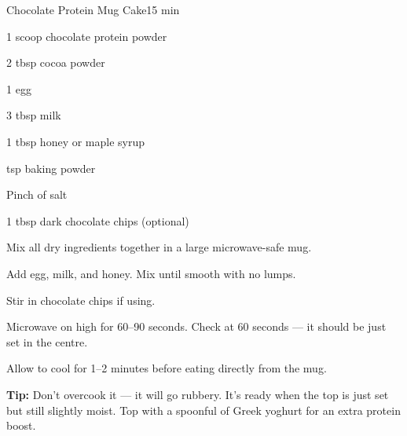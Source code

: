 \begin{recipebox}{Chocolate Protein Mug Cake}{1}{5 min}
\begin{ingredients}
  \item 1 scoop chocolate protein powder
  \item 2 tbsp cocoa powder
  \item 1 egg
  \item 3 tbsp milk
  \item 1 tbsp honey or maple syrup
  \item \textonehalf{} tsp baking powder
  \item Pinch of salt
  \item 1 tbsp dark chocolate chips (optional)
\end{ingredients}

\begin{method}
  \item Mix all dry ingredients together in a large microwave-safe mug.
  \item Add egg, milk, and honey. Mix until smooth with no lumps.
  \item Stir in chocolate chips if using.
  \item Microwave on high for 60--90 seconds. Check at 60 seconds --- it should be just set in the centre.
  \item Allow to cool for 1--2 minutes before eating directly from the mug.
\end{method}

\begin{notelist}
  \item \textbf{Tip:} Don't overcook it --- it will go rubbery. It's ready when the top is just set but still slightly moist. Top with a spoonful of Greek yoghurt for an extra protein boost.
\end{notelist}
\end{recipebox}
